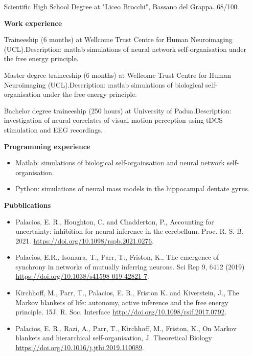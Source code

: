 \documentclass[11pt,usenames, dvipsnames]{article}
\begin{document}
 Scientific High School Degree at "Liceo Brocchi", Bassano del Grappa. 68/100. 

\vspace{1cm}

{\large \bfseries Work experience}\newline
\vspace{-2pt}

 Traineeship (6 months) at Wellcome Trust Centre for Human Neuroimaging (UCL).\newline Description: matlab simulations of neural network self-organisation under the free energy principle.\newline
\vspace{5pt}

 Master degree traineeship (6 months) at Wellcome Trust Centre for Human Neuroimaging (UCL).\newline Description: matlab simulations of biological self-organisation under the free energy principle.\newline

\vspace{5pt}

 Bachelor degree traineeship (250 hours) at University of Padua.\newline Description: investigation of neural correlates of visual motion perception using tDCS stimulation and EEG recordings.\newline

\vspace{1cm}
\newpage
{\large \bfseries Programming experience}
\begin{itemize}
\item Matlab: simulations of biological self-orgainsation and neural network self-organisation.
\item Python: simulations of neural mass models in the hippocampal dentate gyrus.  
\end{itemize}

\vspace{.9cm}

{\large \bfseries Pubblications}
\begin{itemize}
\item Palacios, E. R., Houghton, C. and Chadderton, P., Accounting for uncertainty: inhibition for neural inference in the cerebellum. Proc. R. S. B, 2021. \url{https://doi.org/10.1098/rspb.2021.0276}.
\item Palacios, E.R., Isomura, T., Parr, T., Friston, K., The emergence of synchrony in networks of mutually inferring neurons. Sci Rep 9, 6412 (2019) \url{https://doi.org/10.1038/s41598-019-42821-7}.
\item Kirchhoff, M., Parr, T., Palacios, E. R., Friston K. and Kiverstein, J., The Markov blankets of life: autonomy, active inference and the free energy principle. 15J. R. Soc. Interface \url{http://doi.org/10.1098/rsif.2017.0792}.
\item  Palacios, E. R., Razi, A., Parr, T., Kirchhoff, M., Friston, K., On Markov blankets and hierarchical self-organisation, J. Theoretical Biology \url{https://doi.org/10.1016/j.jtbi.2019.110089}.
\end{itemize}
\end{document}
